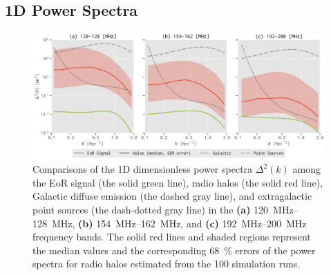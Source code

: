 \documentclass[twocolumn]{aastex62}
\begin{document}
\subsection{1D Power Spectra}
\label{sec:ps1d}

\begin{figure}
  \centering
  \includegraphics[width=\textwidth]{ps1d-3bands}
  \caption{\label{fig:ps1d-3bands}%
    Comparisons of the 1D dimensionless power spectra $\Delta^2(k)$
    among the EoR signal (the solid green line), radio halos (the solid
    red line), Galactic diffuse emission (the dashed gray line), and
    extragalactic point sources (the dash-dotted gray line) in the
    \textbf{(a)} \SIrange{120}{128}{\MHz},
    \textbf{(b)} \SIrange{154}{162}{\MHz}, and
    \textbf{(c)} \SIrange{192}{200}{\MHz} frequency bands.
    The solid red lines and shaded regions represent the median values
    and the corresponding \SI{68}{\percent} errors of the power spectra
    for radio halos estimated from the 100 simulation runs.
  }
\end{figure}
\end{document}
